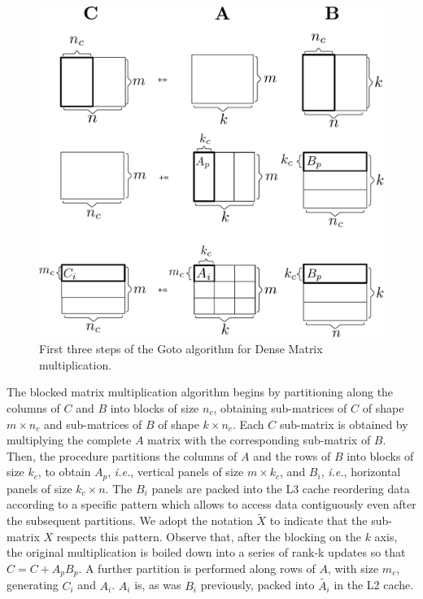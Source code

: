 \begin{figure}[htb]
	\centering
	\includegraphics[width=\columnwidth]{imgs/Goto_first.pdf}
	\caption{First three steps of the Goto algorithm for Dense Matrix multiplication.}
		\label{fig:gotofirst}
\end{figure}

The blocked matrix multiplication algorithm begins by partitioning along the columns of $C$ and $B$ into blocks of size $n_c$, obtaining  sub-matrices of $C$ of shape $m \times n_c$ and sub-matrices of $B$ of shape $k \times n_c$. Each $C$ sub-matrix is obtained by multiplying the complete $A$ matrix with the corresponding sub-matrix of $B$. Then, the procedure partitions the columns of $A$ and the rows of $B$ into blocks of size $k_c$, to obtain $A_p$, \textit{i.e.}, vertical panels of size $m \times k_c$, and $B_i$, \textit{i.e.}, horizontal panels of size $k_c \times n$. The $B_i$ panels are packed into the L3 cache reordering data according to a specific pattern which allows to access data contiguously even after the subsequent partitions.  We adopt the notation $\tilde{X}$ to indicate that the sub-matrix $X$ respects this pattern. Observe that, after the blocking on the $k$ axis, the original multiplication is boiled down into a series of rank-k updates so that $C = C + A_p B_p$. A further partition is performed along rows of $A$, with size $m_c$, generating $C_i$ and $A_i$. $A_i$ is, as was $B_i$ previously, packed into $\tilde{A_i}$ in the L2 cache.

